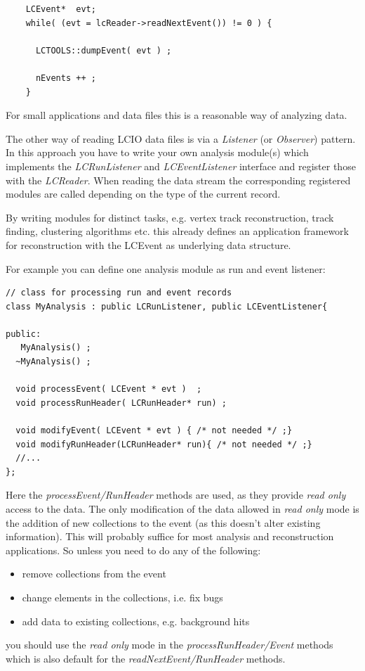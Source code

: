 \documentclass[twoside]{article}
\begin{document}
\begin{verbatim}
    LCEvent*  evt;
    while( (evt = lcReader->readNextEvent()) != 0 ) {
      
      LCTOOLS::dumpEvent( evt ) ;
      
      nEvents ++ ;
    }
\end{verbatim}

For small applications and data files this is a reasonable way of analyzing data.

The other way of reading LCIO data files is via a {\em Listener} (or {\em Observer}) pattern.
In this approach you have to write your own analysis module(s) which implements the 
{\em LCRunListener} and {\em LCEventListener} interface and register those with the {\em LCReader}.
When reading the data stream the corresponding registered modules are called depending on the type 
of the current record. 

By writing modules for distinct tasks, e.g. vertex track reconstruction, 
track finding, clustering algorithms etc. this already defines an application framework for 
reconstruction with the LCEvent as underlying data structure.

For example you can define one analysis module as run and event listener:

\begin{verbatim}
// class for processing run and event records
class MyAnalysis : public LCRunListener, public LCEventListener{
 
public:
   MyAnalysis() ;
  ~MyAnalysis() ;
 
  void processEvent( LCEvent * evt )  ;
  void processRunHeader( LCRunHeader* run) ;
 
  void modifyEvent( LCEvent * evt ) { /* not needed */ ;}
  void modifyRunHeader(LCRunHeader* run){ /* not needed */ ;}
  //...
};
\end{verbatim}

Here the {\em processEvent/RunHeader} methods are used, as they provide {\em read only} access to the 
data. The only modification of the data allowed in {\em read only} mode is the addition of new 
collections to the event (as this doesn't alter existing information). This will probably suffice for 
most analysis and reconstruction applications.
So unless you need to do any of the following:
\begin{itemize}
\item remove collections from the event
\item change elements in the collections, i.e. fix bugs
\item add data to existing collections, e.g. background hits
\end{itemize}
you should use the {\em read only} mode in the {\em processRunHeader/Event} methods 
which is also default for the {\em readNextEvent/RunHeader} methods.
\end{document}

